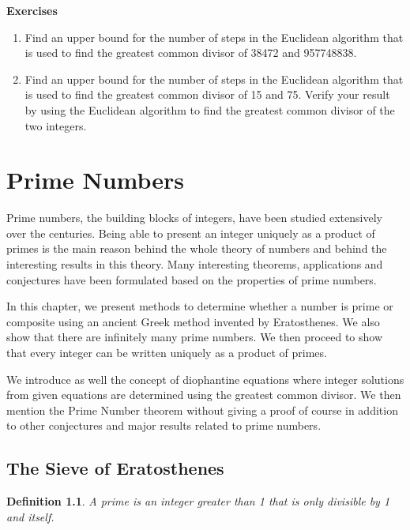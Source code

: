 \documentclass[12pt,letterpaper]{book}
\newtheorem{definition}{Definition}
\begin{document}
\textbf{Exercises}
\begin{enumerate}
\item{Find an upper bound for the number of steps in the Euclidean
algorithm that is used to find the greatest common divisor of
38472 and 957748838.}\\
\item{Find an upper bound for the number of steps in the Euclidean
algorithm that is used to find the greatest common divisor of 15 and
75.  Verify your result by using the Euclidean algorithm to find the
greatest common divisor of the two
integers.}\\
\end{enumerate}







\chapter{Prime Numbers}
Prime numbers, the building blocks of integers, have been studied
extensively over the centuries.  Being able to present an integer
uniquely as a product of primes is the main reason behind the whole
theory of numbers and behind the interesting results in this theory.
Many interesting theorems, applications and conjectures have been
formulated based on the properties of prime numbers.
\par In this chapter, we present methods to determine whether a number
is prime or composite using an ancient Greek method invented by
Eratosthenes.  We also show that there are infinitely many prime
numbers. We then proceed to show that every integer can be written
uniquely as a product of primes.  \par We introduce as well the
concept of diophantine equations where integer solutions from given
equations are determined using the greatest common divisor. We then
mention the Prime Number theorem without giving a proof of course in
addition to other conjectures and major results related to prime
numbers.

\newpage

\section{The Sieve of Eratosthenes}

\begin{definition} 
A prime is an integer greater than 1 that is only divisible by 1 and
itself.
\end{definition}
\end{document}

